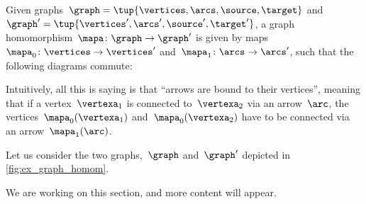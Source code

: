 

\section{}

\begin{definition}
    \label{def:graph_homom}
    Given graphs~$\graph=\tup{\vertices,\arcs,\source,\target}$ and~$\graph'=\tup{\vertices',\arcs',\source',\target'}$, a graph homomorphism~$\mapa \colon \graph \to \graph'$ is given by maps~$\mapa_0\colon \vertices \to \vertices'$ and~$\mapa_1\colon \arcs \to \arcs'$, such that the following diagrams commute:
    \begin{center}
    \end{center}
\end{definition}
\begin{remark}
    Intuitively, all this is saying is that ``arrows are bound to their vertices'', meaning that if a vertex~$\vertexa_1$ is connected to~$\vertexa_2$ via an arrow~$\arc$, the vertices~$\mapa_0(\vertexa_1)$ and~$\mapa_0(\vertexa_2)$ have to be connected via an arrow~$\mapa_1(\arc)$.
\end{remark}

\begin{example}
    Let us consider the two graphs,~$\graph$ and~$\graph'$ depicted in \cref{fig:ex_graph_homom}.

    \begin{figure}[h]
        \begin{center}
        \end{center}
    \end{figure}
    \label{fig:ex_graph_homom}
\end{example}

\begin{example}[Counterexample]
\end{example}


\begin{publictodo}We are working on this section, and more content will appear.\end{publictodo}

